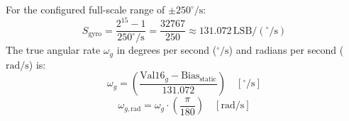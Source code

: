 \documentclass[11pt, a4paper]{article}
\begin{document}
For the configured full-scale range of $\pm 250^\circ/\text{s}$:
\begin{equation}
    S_{\text{gyro}} = \frac{2^{15}-1}{250^\circ/\text{s}} = \frac{32767}{250} \approx 131.072\,\text{LSB}/(^\circ/\text{s})
\end{equation}
The true angular rate $\omega_g$ in degrees per second ($^\circ/\text{s}$) and radians per second ($\text{rad/s}$) is:
\begin{equation}
    \omega_{g} = \left(\frac{\text{Val16}_g - \text{Bias}_{\text{static}}}{131.072}\right) \quad [^\circ/\text{s}]
\end{equation}
\begin{equation}
    \omega_{g, \text{rad}} = \omega_g \cdot \left(\frac{\pi}{180}\right) \quad [\text{rad/s}]
\end{equation}
\end{document}
